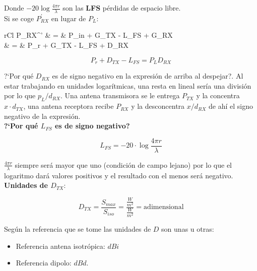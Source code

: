 \documentclass[10pt,portrait, twocolumn]{article}
\begin{document}
Donde $ - 20 \log \frac{4 \pi r}{\lambda}$ son las \textbf{LFS} pérdidas de espacio libre.\\

Si se coge $P_{RX}^{'}$ en lugar de $P_{L}$:

	\begin{IEEEeqnarray*}{rCl}
		P_{RX}^{'} & = & P_{in} + G_{TX} - L_{FS} + G_{RX} \\
				 & = & P_{r} + G_{TX} - L_{FS} + D_{RX} 
	\end{IEEEeqnarray*}	

	\begin{equation*}
		P_{r} + D_{TX} - L_{FS} = P_{L} D_{RX}
	\end{equation*}
	
?`Por qué $D_{RX}$ es de signo negativo en la expresión de arriba al despejar?. Al estar trabajando en unidades logarítmicas, una resta en lineal sería una división por lo que $p_{L} / d_{RX}$. Una antena transmisora se le entrega $P_{TX}$ y la concentra $x \cdot d_{TX}$, una antena receptora recibe $P_{RX}$ y la desconcentra $ x / d_{RX} $ de ahí el signo negativo de la expresión.\\

\textbf{?`Por qué $L_{FS}$ es de signo negativo?}

	\begin{equation*}
	L_{FS} = -20 \cdot \log \frac{4 \pi r}{\lambda}
	\end{equation*}

$\frac{4 \pi r}{\lambda}$ siempre será mayor que uno (condición de campo lejano) por lo que el logaritmo dará valores positivos y el resultado con el menos será negativo.\\

\textbf{Unidades de $D_{TX}$}:

	\begin{equation*}
		D_{TX} = \frac{S_{max}}{S_{iso}} = \frac{\frac{W}{m^{2}}}{\frac{W}{m^{2}}} = \text{adimensional}
	\end{equation*}

Según la referencia que se tome las unidades de $D$ son unas u otras:

	\begin{itemize}
	\item Referencia antena isotrópica: $dBi$
	\item Referencia dipolo: $dBd$.
	\end{itemize}





\end{document}

